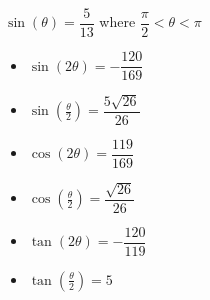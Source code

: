 {$\sin(\theta) = \dfrac{5}{13}$ where $\dfrac{\pi}{2} < \theta < \pi$}
{\begin{itemize}
\item $\sin(2\theta) = -\dfrac{120}{169}$
\item $\sin\left(\frac{\theta}{2}\right) = \dfrac{5\sqrt{26}}{26}$
\item $\cos(2\theta) = \dfrac{119}{169}$
\item $\cos\left(\frac{\theta}{2}\right) = \dfrac{\sqrt{26}}{26}$
\item $\tan(2\theta)=-\dfrac{120}{119}$
\item $\tan\left(\frac{\theta}{2}\right) = 5$
\end{itemize}
}
